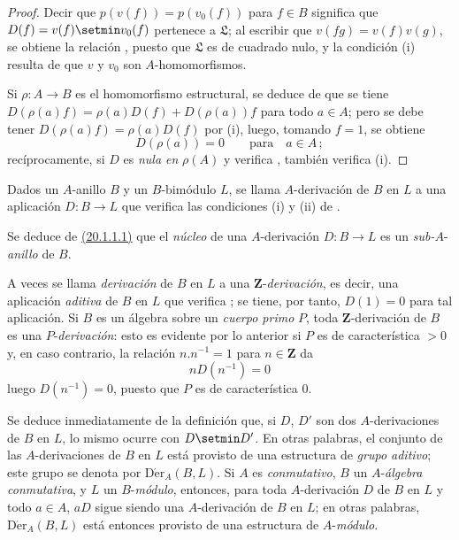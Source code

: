 \begin{proof}
Decir que $p(v(f))=p(v_0(f))$ para $f\in B$ significa que
$D(f)=v(f)\setmin v_0(f)$ pertenece a $\mathfrak{L}$; al escribir que
$v(fg)=v(f)v(g)$, se obtiene la relación ,
puesto que $\mathfrak{L}$ es de cuadrado nulo, y la condición (i) resulta de que
$v$ y $v_0$ son $A$-homomorfismos.

Si $\rho:A\to B$ es el homomorfismo estructural, se deduce de
 que se tiene
$D(\rho(a)f)=\rho(a)D(f)+D(\rho(a))f$ para todo $a\in A$; pero se debe
tener $D(\rho(a)f)=\rho(a)D(f)$ por (i), luego, tomando $f=1$, se
obtiene
\[
  D(\rho(a))=0 \qquad\text{para}\quad a\in A\,;
\]
recíprocamente, si $D$ es \emph{nula en} $\rho(A)$ y verifica
, también verifica (i).
\end{proof}

\begin{definition}[20.1.2]
\label{0.20.1.2-fr}
Dados un $A$-anillo $B$ y un $B$-bimódulo $L$, se llama
$A$-derivación de $B$ en $L$ a una aplicación $D:B\to L$ que verifica
las condiciones \textup{(i)} y \textup{(ii)} de .
\end{definition}

Se deduce de \hyperref[0.20.1.1-fr]{\textup{(20.1.1.1)}} que el \emph{núcleo} de una $A$-derivación
$D:B\to L$ es un \emph{sub-}$A$-\emph{anillo} de $B$.

A veces se llama \emph{derivación} de $B$ en $L$ a una
$\mathbf{Z}$-\emph{derivación}, es decir, una aplicación \emph{aditiva} de $B$
en $L$ que verifica ; se tiene, por tanto, $D(1)=0$ para tal
aplicación. Si $B$ es un álgebra sobre un \emph{cuerpo primo} $P$, toda
$\mathbf{Z}$-derivación de $B$ es una $P$-\emph{derivación}: esto es evidente por lo
anterior si $P$ es de característica $>0$ y, en caso contrario,
la relación $n.n^{-1}=1$ para $n\in\mathbf{Z}$ da
\[
  nD(n^{-1})=0
\]
luego $D(n^{-1})=0$, puesto que $P$ es de característica $0$.

Se deduce inmediatamente de la definición  que, si $D$, $D'$
son dos $A$-derivaciones de $B$ en $L$, lo mismo ocurre con $D\setmin D'$. En otras
palabras, el conjunto de las $A$-derivaciones de $B$ en $L$ está provisto de una
estructura de \emph{grupo aditivo}; este grupo se denota por
$\operatorname{D\acute{e}r}_A(B,L)$. Si $A$ es \emph{conmutativo}, $B$ un
$A$-\emph{álgebra conmutativa}, y $L$ un $B$-\emph{módulo}, entonces, para toda
$A$-derivación $D$ de $B$ en $L$ y todo $a\in A$, $aD$ sigue siendo una
$A$-derivación de $B$ en $L$; en otras palabras, $\operatorname{D\acute{e}r}_A(B,L)$
está entonces provisto de una estructura de $A$-\emph{módulo}.

